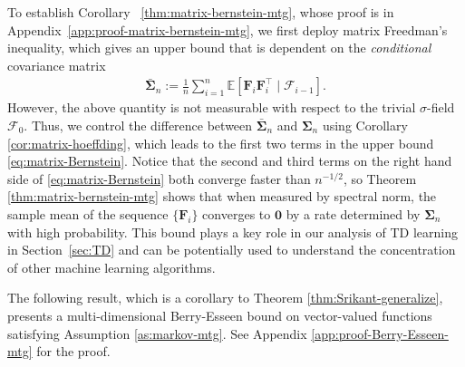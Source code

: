 To establish Corollary ~\ref{thm:matrix-bernstein-mtg}, whose proof is in Appendix~\ref{app:proof-matrix-bernstein-mtg}, we first deploy  matrix Freedman's inequality, which gives an upper bound that is dependent on the \emph{conditional} covariance matrix
\begin{align*}
\bar{\bm{\Sigma}}_n := \frac{1}{n}\sum_{i=1}^n \mathbb{E}[\bm{F}_i\bm{F}_i^\top\mid \mathcal{F}_{i-1}].
\end{align*}
However, the above quantity is not measurable with respect to the trivial $\sigma$-field $\mathscr{F}_0$.
Thus, we control the difference between $\bar{\bm{\Sigma}}_n$ and $\bm{\Sigma}_n$ using Corollary \ref{cor:matrix-hoeffding}, which leads to the first two terms in the upper bound \eqref{eq:matrix-Bernstein}. Notice that the second and third terms on the right hand side of \eqref{eq:matrix-Bernstein} both converge faster than $n^{-1/2}$, so Theorem \ref{thm:matrix-bernstein-mtg} shows that when measured by spectral norm, the sample mean of the sequence $\{\bm{F}_i\}$ converges to $\bm{0}$ by a rate determined by $\bm{\Sigma}_n$ with high probability. This bound plays a key role in 
our analysis of TD learning in Section~\ref{sec:TD} and can be potentially used to understand the concentration of other machine learning algorithms. 

The following result, which is a corollary to Theorem \ref{thm:Srikant-generalize}, presents a multi-dimensional Berry-Esseen bound on vector-valued functions satisfying Assumption \ref{as:markov-mtg}. See Appendix \ref{app:proof-Berry-Esseen-mtg} for the proof.

